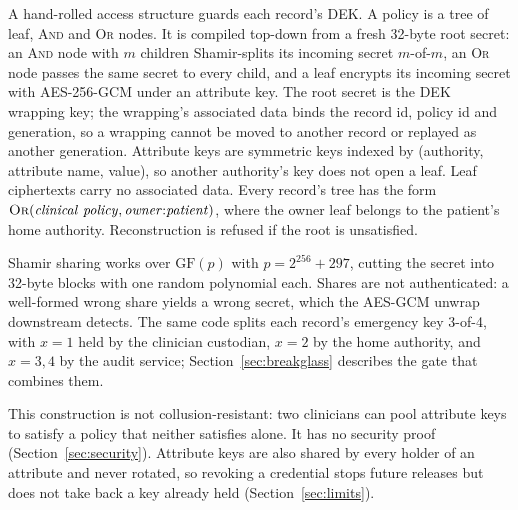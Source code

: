 A hand-rolled access structure guards each record's DEK.
A policy is a tree of leaf, \textsc{And} and \textsc{Or} nodes.
It is compiled top-down from a fresh 32-byte root secret: an \textsc{And}
node with $m$ children Shamir-splits its incoming secret $m$-of-$m$, an
\textsc{Or} node passes the same secret to every child, and a leaf encrypts
its incoming secret with AES-256-GCM under an attribute key.
The root secret is the DEK wrapping key; the wrapping's associated data binds
the record id, policy id and generation, so a wrapping cannot be moved to
another record or replayed as another generation.
Attribute keys are symmetric keys indexed by (authority, attribute name,
value), so another authority's key does not open a leaf.
Leaf ciphertexts carry no associated data.
Every record's tree has the form
$\textsc{Or}(\mathit{clinical\ policy}, \mathit{owner}{:}\mathit{patient})$,
where the owner leaf belongs to the patient's home authority.
Reconstruction is refused if the root is unsatisfied.

Shamir sharing works over $\mathrm{GF}(p)$ with $p = 2^{256}+297$, cutting the
secret into 32-byte blocks with one random polynomial each.
Shares are not authenticated: a well-formed wrong share yields a wrong secret,
which the AES-GCM unwrap downstream detects.
The same code splits each record's emergency key 3-of-4, with $x=1$ held by
the clinician custodian, $x=2$ by the home authority, and $x=3,4$ by the audit
service; Section~\ref{sec:breakglass} describes the gate
that combines them.

This construction is not collusion-resistant: two clinicians can pool
attribute keys to satisfy a policy that neither satisfies alone.
It has no security proof (Section~\ref{sec:security}).
Attribute keys are also shared by every holder of an attribute and never
rotated, so revoking a credential stops future releases but does not take
back a key already held (Section~\ref{sec:limits}).
